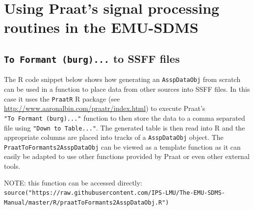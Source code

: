 \documentclass[]{book}
\begin{document}
\hypertarget{sec:app-chap-wrassp-praatsSigProc}{%
\section{Using Praat's signal processing routines in the EMU-SDMS}\label{sec:app-chap-wrassp-praatsSigProc}}

\hypertarget{to-formant-burg...-to-ssff-files}{%
\subsection{\texorpdfstring{\texttt{To\ Formant\ (burg)...} to SSFF files}{To Formant (burg)... to SSFF files}}\label{to-formant-burg...-to-ssff-files}}

The R code snippet below shows how generating an \texttt{AsspDataObj} from scratch can be used in a function to place data from other sources into SSFF files. In this case it uses the \texttt{PraatR} R package (see \url{http://www.aaronalbin.com/praatr/index.html}) to execute Praat's \texttt{"To\ Formant\ (burg)..."} function to then store the data to a comma separated file using \texttt{"Down\ to\ Table..."}. The generated table is then read into R and the appropriate columns are placed into tracks of a \texttt{AsspDataObj} object. The \texttt{PraatToFormants2AsspDataObj} can be viewed as a template function as it can easily be adapted to use other functions provided by Praat or even other external tools.

NOTE: this function can be accessed directly: \texttt{source("https://raw.githubusercontent.com/IPS-LMU/The-EMU-SDMS-Manual/master/R/praatToFormants2AsspDataObj.R")}
\end{document}
